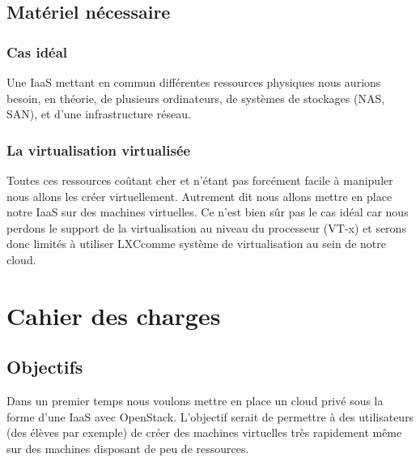 \documentclass{report}
\begin{document}
\section{Matériel nécessaire}
\subsection{Cas idéal}
Une IaaS mettant en commun différentes ressources physiques nous aurions besoin, en théorie, de plusieurs ordinateurs, de systèmes de stockages (NAS\footnotemark[2], SAN\footnotemark[3]), et d'une infrastructure réseau.


\subsection{La virtualisation virtualisée}
Toutes ces ressources coûtant cher et n'étant pas forcément facile à manipuler nous allons les créer virtuellement. Autrement dit nous allons mettre en place notre IaaS sur des machines virtuelles. Ce n'est bien sûr pas le cas idéal car nous perdons le support de la virtualisation au niveau du processeur (VT-x\footnotemark[4]) et serons donc limités à utiliser LXC\footnotemark[5] comme système de virtualisation au sein de notre cloud.


\chapter{Cahier des charges}
\section{Objectifs}
Dans un premier temps nous voulons mettre en place un cloud privé sous la forme d'une IaaS avec OpenStack. L'objectif serait de permettre à des utilisateurs (des élèves par exemple) de créer des machines virtuelles très rapidement même sur des machines disposant de peu de ressources.\\
\end{document}
